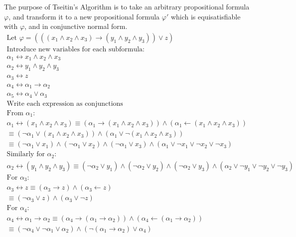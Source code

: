 \documentclass[12pt]{fphw}
\begin{document}
The purpose of Tseitin's Algorithm is to take an arbitrary propositional formula $\varphi$, and transform it to a new propositional formula $\varphi'$ which is equisatisfiable with $\varphi$, and in conjunctive normal form.
\begin{gather*}
  \text{Let } \varphi = (((x_1 \wedge x_2 \wedge x_3) \to (y_1 \wedge y_2 \wedge y_3)) \vee z) \\
  \text{Introduce new variables for each subformula:} \\
  \alpha_1 \leftrightarrow x_1 \wedge x_2 \wedge x_3 \\
  \alpha_2 \leftrightarrow y_1 \wedge y_2 \wedge y_3 \\
  \alpha_3 \leftrightarrow z \\
  \alpha_4 \leftrightarrow \alpha_1 \to \alpha_2 \\
  \alpha_5 \leftrightarrow \alpha_4 \vee \alpha_3 \\
  \text{Write each expression as conjunctions} \\
  \text{From } \alpha_1: \\
  \alpha_1 \leftrightarrow (x_1 \wedge x_2 \wedge x_3) \equiv (\alpha_1 \to (x_1 \wedge x_2 \wedge x_3)) \wedge (\alpha_1 \leftarrow (x_1 \wedge x_2 \wedge x_3)) \\
  \equiv (\neg \alpha_1 \vee (x_1 \wedge x_2 \wedge x_3)) \wedge (\alpha_1 \vee \neg(x_1 \wedge x_2 \wedge x_3)) \\
  \equiv (\neg \alpha_1 \vee x_1) \wedge (\neg \alpha_1 \vee x_2) \wedge (\neg \alpha_1 \vee x_3) \wedge (\alpha_1 \vee \neg x_1 \vee \neg x_2 \vee \neg x_3) \\
  \text{Similarly for } \alpha_2: \\
  \alpha_2 \leftrightarrow (y_1 \wedge y_2 \wedge y_3) \equiv (\neg \alpha_2 \vee y_1) \wedge (\neg \alpha_2 \vee y_2) \wedge (\neg \alpha_2 \vee y_3) \wedge (\alpha_2 \vee \neg y_1 \vee \neg y_2 \vee \neg y_3) \\
  \text{For } \alpha_3: \\
  \alpha_3 \leftrightarrow z \equiv (\alpha_3 \to z) \wedge (\alpha_3 \leftarrow z) \\
  \equiv (\neg \alpha_3 \vee z) \wedge (\alpha_3 \vee \neg z) \\
  \text{For } \alpha_4: \\
  \alpha_4 \leftrightarrow \alpha_1 \to \alpha_2 \equiv (\alpha_4 \to (\alpha_1 \to \alpha_2)) \wedge (\alpha_4 \leftarrow  (\alpha_1 \to \alpha_2)) \\
  \equiv (\neg \alpha_4 \vee \neg \alpha_1 \vee \alpha_2) \wedge (\neg(\alpha_1 \to \alpha_2) \vee \alpha_4) \\

\end{gather*}
\end{document}
